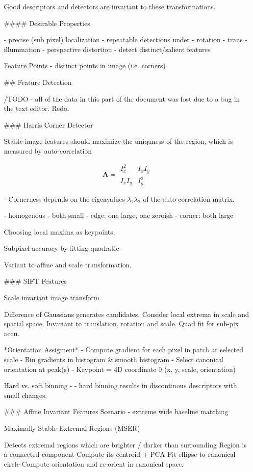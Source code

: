 Good descriptors and detectors are invariant to these transformations.

#### Desirable Properties

- precise (sub pixel) localization
- repeatable detections under 
  - rotation
  - trans
  - illumination
  - perspective distortion
- detect distinct/salient features

Feature Points - distinct points in image (i.e. corners)

## Feature Detection

/TODO - all of the data in this part of the document was lost due to a bug in the text editor. Redo.

### Harris Corner Detector

Stable image features should maximize the uniquness of the region, which is measured by auto-correlation 

$$ \mathbf{A} =  \begin{matrix} I_x^2 &  I_xI_y \\
I_xI_y & I_y^2
\end{matrix} $$

- Cornerness depends on the eigenvalues $\lambda_1 \lambda_2$ of the auto-correlation matrix.

- homogenous - both small
- edge: one large, one zeroish
- corner: both large

Choosing local maxima as keypoints. 

Subpixel accuracy by fitting quadratic 

Variant to affine and scale transformation.

### SIFT Features

Scale invariant image transform.

Difference of Gaussians generates candidates. 
Consider local extrema in scale and spatial space.
Invariant to translation, rotation and scale.
Quad fit for sub-pix accu.

*Orientation Assigment*
- Compute gradient for each pixel in patch at selected scale
- Bin gradients in histogram & smooth histogram
- Select canonical orientation at peak(s)
- Keypoint = 4D coordinate 0 (x, y, scale, orientation)

Hard vs. soft binning -
- hard binning results in discontinous descriptors with small changes.

### Affine Invariant Features
Scenario - extreme wide baseline matching

Maximally Stable Extremal Regions (MSER)

Detects extremal regions which are brighter / darker than surrounding
Region is a connected component
Compute its centroid + PCA
Fit ellipse to canonical circle
Compute orientation and re-orient in canonical space.

